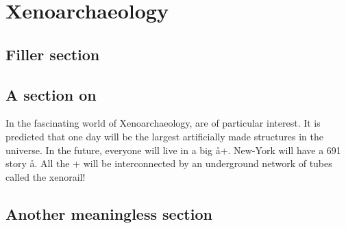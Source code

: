 \documentclass[a4paper,12pt,twoside,openright]{memoir}
\begin{document}
\glsunsetall
\tableofcontents

\chapter{Xenoarchaeology}

\section{Filler section}
\kant*[1-2]

\section{A section on \AAs{}} %
In the fascinating world of Xenoarchaeology, \AAs are of particular interest.
It is predicted that one day \AAs will be the largest artificially made 
structures in the universe. In the future, everyone will live in a big \aa+. 
New-York will have a 691 story \aa. All the \aas+ will be interconnected by an
underground network of tubes called the xenorail!


\section{Another meaningless section}
\kant*[3-4]

\printglossary
\end{document}
